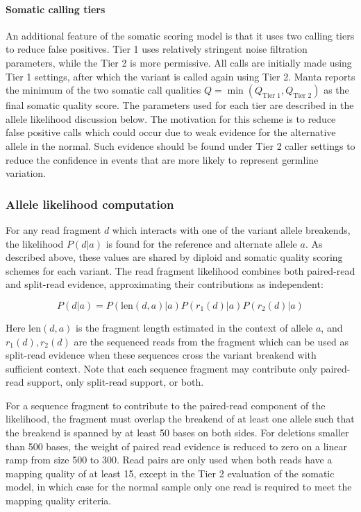\documentclass{article}
\begin{document}
\paragraph{Somatic calling tiers}

An additional feature of the somatic scoring model is that it uses two calling tiers to reduce false positives. Tier 1 uses relatively stringent noise filtration parameters, while the Tier 2 is more permissive. All calls are initially made using Tier 1 settings, after which the variant is called again using Tier 2. Manta reports the minimum of the two somatic call qualities $Q = \min(Q_{\text{Tier 1}},Q_{\text{Tier 2}})$ as the final somatic quality score. The parameters used for each tier are described in the allele likelihood discussion below. The motivation for this scheme is to reduce false positive calls which could occur due to weak evidence for the alternative allele in the normal. Such evidence should be found under Tier 2 caller settings to reduce the confidence in events that are more likely to represent germline variation.

\subsubsection{Allele likelihood computation}

For any read fragment $d$ which interacts with one of the variant allele breakends, the likelihood $P(d \vert a)$ is found for the reference and alternate allele $a$. As described above, these values are shared by diploid and somatic quality scoring schemes for each variant. The read fragment likelihood combines both paired-read and split-read evidence, approximating their contributions as independent:

\begin{equation*}
P(d \vert a) = P ( \text{len}(d,a) \vert a) P( r_1(d) \vert a) P ( r_2(d) \vert a)
\end{equation*}

Here $\text{len}(d,a)$ is the fragment length estimated in the context of allele $a$, and $r_1(d),r_2(d)$ are the sequenced reads from the fragment which can be used as split-read evidence when these sequences cross the variant breakend with sufficient context. Note that each sequence fragment may contribute only paired-read support, only split-read support, or both.

For a sequence fragment to contribute to the paired-read component of the likelihood, the fragment must overlap the breakend of at least one allele such that the breakend is spanned by at least 50 bases on both sides. For deletions smaller than 500 bases, the weight of paired read evidence is reduced to zero on a linear ramp from size 500 to 300. Read pairs are only used when both reads have a mapping quality of at least 15, except in the Tier 2 evaluation of the somatic model, in which case for the normal sample only one read is required to meet the mapping quality criteria.
\end{document}
